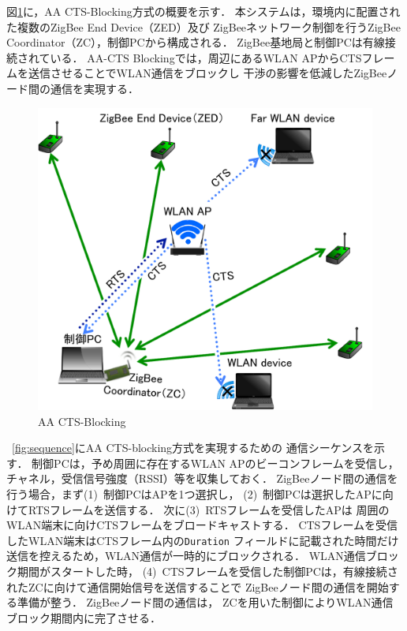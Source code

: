 \documentclass[technicalreport]{ieicej}
\begin{document}
図\ref{fig:aa_cts_blocking}に，AA CTS-Blocking方式の概要を示す．
本システムは，環境内に配置された複数のZigBee End Device（ZED）及び
ZigBeeネットワーク制御を行うZigBee Coordinator（ZC），制御PCから構成される．
ZigBee基地局と制御PCは有線接続されている．
AA-CTS Blockingでは，周辺にあるWLAN APからCTSフレームを送信させることでWLAN通信をブロックし
干渉の影響を低減したZigBeeノード間の通信を実現する．


\begin{figure}[bt]
 \centering
 \includegraphics[width=\columnwidth]{figure/aa_cts_blocking.pdf}
 \caption{AA CTS-Blocking}
 \label{fig:aa_cts_blocking}
\end{figure}

\figurename~\ref{fig:sequence}にAA CTS-blocking方式を実現するための
通信シーケンスを示す．
制御PCは，予め周囲に存在するWLAN APのビーコンフレームを受信し，
チャネル，受信信号強度（RSSI）等を収集しておく．
ZigBeeノード間の通信を行う場合，まず(1)~制御PCはAPを1つ選択し，
(2)~制御PCは選択したAPに向けてRTSフレームを送信する．
次に(3)~RTSフレームを受信したAPは
周囲のWLAN端末に向けCTSフレームをブロードキャストする．
CTSフレームを受信したWLAN端末はCTSフレーム内の\texttt{Duration}
フィールドに記載された時間だけ送信を控えるため，WLAN通信が一時的にブロックされる．
WLAN通信ブロック期間がスタートした時，
(4)~CTSフレームを受信した制御PCは，有線接続されたZCに向けて通信開始信号を送信することで
ZigBeeノード間の通信を開始する準備が整う．
ZigBeeノード間の通信は，
ZCを用いた制御によりWLAN通信ブロック期間内に完了させる．
\end{document}
